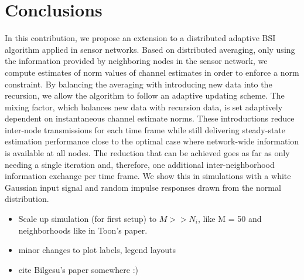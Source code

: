 \documentclass{article}
\begin{document}
\section[]{Conclusions}
\label{sec:conclusions}
In this contribution, we propose an extension to a distributed adaptive BSI algorithm applied in sensor networks.
Based on distributed averaging, only using the information provided by neighboring nodes in the sensor network, we compute estimates of norm values of channel estimates in order to enforce a norm constraint.
By balancing the averaging with introducing new data into the recursion, we allow the algorithm to follow an adaptive updating scheme.
The mixing factor, which balances new data with recursion data, is set adaptively dependent on instantaneous channel estimate norms.
These introductions reduce inter-node transmissions for each time frame while still delivering steady-state estimation performance close to the optimal case where network-wide information is available at all nodes.
The reduction that can be achieved goes as far as only needing a single iteration and, therefore, one additional inter-neighborhood information exchange per time frame.
We show this in simulations with a white Gaussian input signal and random impulse responses drawn from the normal distribution.
\begin{todo}
    \begin{itemize}
        \item Scale up simulation (for first setup) to \(M >> N_i\), like M = 50 and neighborhoods like in Toon's paper.
        \item minor changes to plot labels, legend layouts
        \item cite Bilgesu's paper somewhere :)
    \end{itemize}
\end{todo}

\vfill\pagebreak



\end{document}

